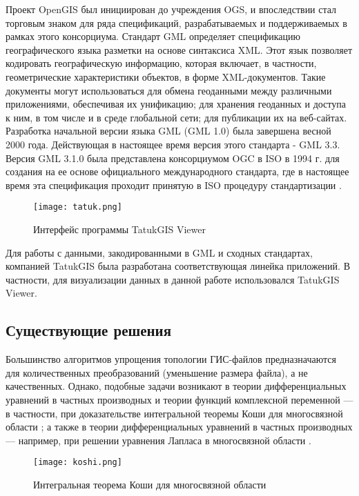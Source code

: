 Проект OpenGIS был инициирован до учреждения OGS, и впоследствии стал торговым знаком для ряда спецификаций, разрабатываемых и поддерживаемых в рамках этого консорциума. Стандарт GML определяет спецификацию географического языка разметки на основе синтаксиса XML. Этот язык позволяет кодировать географическую информацию, которая включает, в частности, геометрические характеристики объектов, в форме XML-документов. Такие документы могут использоваться для обмена геоданными между различными приложениями, обеспечивая их унификацию; для хранения геоданных и доступа к ним, в том числе и в среде глобальной сети; для публикации их на веб-сайтах. Разработка начальной версии языка GML (GML 1.0) была завершена весной 2000 года. Действующая в настоящее время версия этого стандарта - GML 3.3. Версия GML 3.1.0 была представлена консорциумом OGC в ISO в 1994 г. для создания на ее основе официального международного стандарта, где в настоящее время  эта спецификация проходит принятую в ISO процедуру стандартизации \cite{noauthor_iso_nodate}.

\begin{figure}[h]
    \centering
    \texttt{[image: tatuk.png]}
    \caption{Интерфейс программы TatukGIS Viewer}
\end{figure}

Для работы с данными, закодированными в GML и сходных стандартах, компанией TatukGIS была разработана соответствующая линейка приложений. В частности, для визуализации данных в данной работе использовался TatukGIS Viewer.

\subsection{Существующие решения}
\label{}

Большинство алгоритмов упрощения топологии ГИС-файлов предназначаются для количественных преобразований (уменьшение размера файла), а не качественных. Однако, подобные задачи возникают в теории дифференциальных уравнений в частных производных и теории функций комплексной переменной --- в частности, при доказательстве интегральной теоремы Коши для многосвязной области \cite{__nodate}; а также в теории дифференциальных уравнений в частных производных --- например, при решении уравнения Лапласа в многосвязной области \cite{crowdy_transform_2015}.

\begin{figure}[h]
    \centering
    \texttt{[image: koshi.png]}
    \caption{Интегральная теорема Коши для многосвязной области}
\end{figure}


